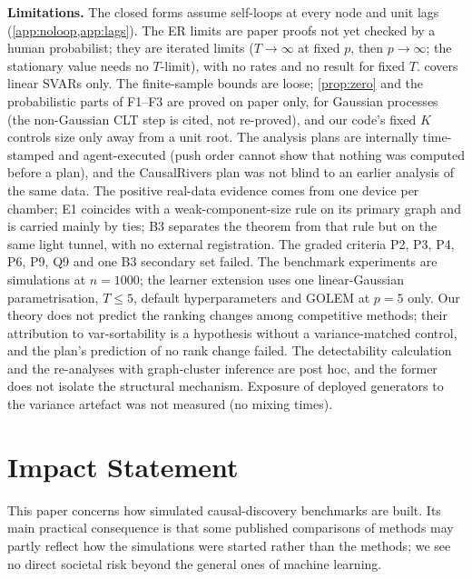 \documentclass{article}
\theoremstyle{plain}
\theoremstyle{definition}
\theoremstyle{remark}
\begin{document}
\textbf{Limitations.} The closed forms assume self-loops at every node and
unit lags (\cref{app:noloop,app:lags}). The ER limits are paper proofs not yet
checked by a human probabilist; they are iterated limits ($T\to\infty$ at
fixed $p$, then $p\to\infty$; the stationary value needs no $T$-limit), with
no rates and no result for fixed $T$.  covers linear SVARs only.
The finite-sample bounds are loose; \cref{prop:zero} and the probabilistic
parts of F1--F3 are proved on paper only, for Gaussian processes (the
non-Gaussian CLT step is cited, not re-proved), and our code's fixed $K$
controls size only away from a unit root. The analysis plans are internally
time-stamped and agent-executed (push order cannot show that nothing was
computed before a plan), and the CausalRivers plan was not blind to an
earlier analysis of the same data. The positive real-data evidence comes from
one device per chamber; E1 coincides with a weak-component-size rule on its
primary graph and is carried mainly by ties; B3 separates the theorem from
that rule but on the same light tunnel, with no external registration. The
graded criteria P2, P3, P4, P6, P9, Q9 and one B3 secondary set failed. The
benchmark experiments are simulations at $n=1000$; the learner extension uses
one linear-Gaussian parametrisation, $T\le5$, default hyperparameters and
GOLEM at $p=5$ only. Our theory does not predict the ranking changes among
competitive methods; their attribution to var-sortability is a hypothesis
without a variance-matched control, and the plan's prediction of no rank
change failed. The detectability calculation and the re-analyses with
graph-cluster inference are post hoc, and the former does not isolate the
structural mechanism. Exposure of deployed generators to the variance
artefact was not measured (no mixing times).

\section*{Impact Statement}
This paper concerns how simulated causal-discovery benchmarks are built. Its
main practical consequence is that some published comparisons of methods may
partly reflect how the simulations were started rather than the methods; we
see no direct societal risk beyond the general ones of machine learning.
\end{document}
